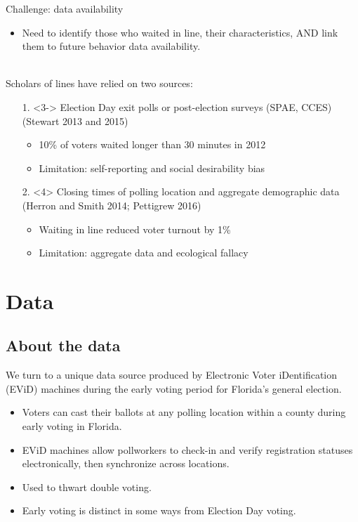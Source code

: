 \documentclass{beamer}
\begin{document}
		
			
	\begin{frame}
          Challenge: data availability 
          \begin{itemize}
          \item<2-> Need to identify those who waited in line, their characteristics, AND link them to future behavior data availability.\\~\\
          \end{itemize}
          Scholars of lines have relied on two sources:
          \begin{itemize}
				\item[1.]<3-> Election Day exit polls or post-election surveys (SPAE, CCES) {\tiny (Stewart 2013 and 2015)}
					\begin{itemize}
						\item<3-> {\small 10\% of voters waited longer than 30 minutes in 2012}
						\item<3-> {\small Limitation: self-reporting and social desirability bias}
					\end{itemize}
				\item[2.]<4> Closing times of polling location and aggregate demographic data {\tiny (Herron and Smith 2014; Pettigrew 2016)}
					\begin{itemize}
						\item<4-> {\small Waiting in line reduced voter turnout by 1\%}
						\item<4-> {\small Limitation: aggregate data and ecological fallacy}
					\end{itemize}
			\end{itemize}
	\end{frame}
		
	
	\section{Data}
	\subsection{About the data}
		\begin{frame}
                  We turn to a unique data source produced by Electronic Voter iDentification (EViD) machines during the early voting period for Florida's general election. 
		 	\begin{itemize}
				\item<2-> Voters can cast their ballots at any polling location within a county during early voting in Florida.
				\item<2-> EViD machines allow pollworkers to check-in and verify registration statuses electronically, then synchronize across locations.
				\item<2-> Used to thwart double
                                  voting.
				\item<3-> Early voting is distinct in
                                  some ways from Election Day voting.
			\end{itemize}
		\end{frame}
		
\end{document}
